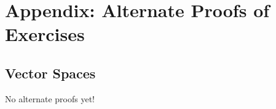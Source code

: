 \appendix

\renewcommand\thesubsection{\thesection\arabic{subsection}}

\section{Appendix: Alternate Proofs of Exercises}

\subsection{Vector Spaces}

No alternate proofs yet!